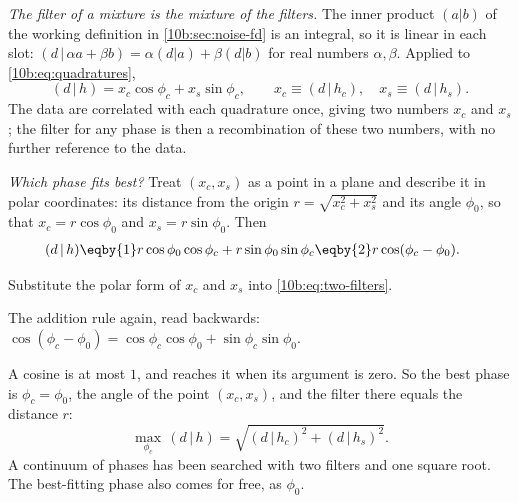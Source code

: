 \emph{The filter of a mixture is the mixture of the filters.} The inner product $(a|b)$ of the working definition
in \cref{10b:sec:noise-fd} is an integral, so it is linear in each slot: $(d\,|\,\alpha a+\beta b)=\alpha(d|a)+\beta(d|b)$
for real numbers $\alpha,\beta$. Applied to \eqref{10b:eq:quadratures},
\begin{equation}
  (d\,|\,h)=x_c\cos\phi_c+x_s\sin\phi_c,
  \qquad x_c\equiv(d\,|\,h_c),\quad x_s\equiv(d\,|\,h_s).
  \label{10b:eq:two-filters}
\end{equation}
The data are correlated with each quadrature once, giving two numbers $x_c$ and $x_s$; the filter for any phase is
then a recombination of these two numbers, with no further reference to the data.

\emph{Which phase fits best?} Treat $(x_c,x_s)$ as a point in a plane and describe it in polar coordinates: its
distance from the origin $r=\sqrt{x_c^2+x_s^2}$ and its angle $\phi_0$, so that $x_c=r\cos\phi_0$ and
$x_s=r\sin\phi_0$. Then
\begin{align}
  (d\,|\,h)
  &\eqby{1}r\cos\phi_0\cos\phi_c+r\sin\phi_0\sin\phi_c
   \eqby{2}r\cos(\phi_c-\phi_0).
  \label{10b:eq:phase-cos}
\end{align}
\begin{explain}
  \item Substitute the polar form of $x_c$ and $x_s$ into \eqref{10b:eq:two-filters}.
  \item The addition rule again, read backwards: $\cos(\phi_c-\phi_0)=\cos\phi_c\cos\phi_0+\sin\phi_c\sin\phi_0$.
\end{explain}
A cosine is at most $1$, and reaches it when its argument is zero. So the best phase is $\phi_c=\phi_0$, the angle of
the point $(x_c,x_s)$, and the filter there equals the distance $r$:
\begin{equation}
  \max_{\phi_c}\,(d\,|\,h)=\sqrt{(d\,|\,h_c)^2+(d\,|\,h_s)^2}.
  \label{10b:eq:phase-max}
\end{equation}
A continuum of phases has been searched with two filters and one square root. The best-fitting phase also comes for
free, as $\phi_0$.

